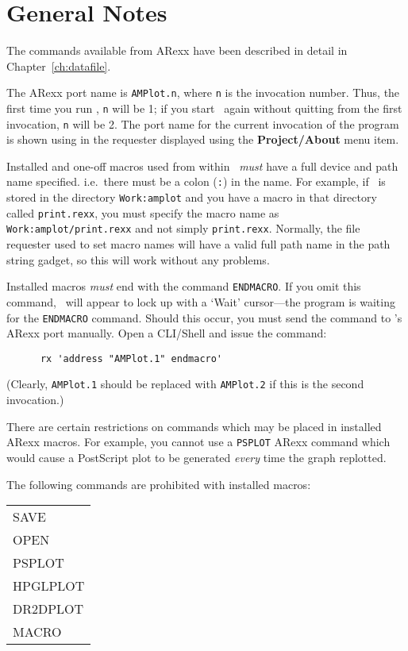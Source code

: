 \section{General Notes}
The commands available from ARexx have been described in detail in 
Chapter~\ref{ch:datafile}.

The ARexx port name is {\tt AMPlot.n}, where {\tt n} is the 
invocation number. 
Thus, the first time you run \amplot, {\tt n} will be 1; if you start \amplot\ 
again without quitting from the first invocation, {\tt n} will be 2. The port 
name for the current invocation of the program is shown using in the requester 
displayed using the {\bf Project/About} menu item.

Installed and one-off macros used from within \amplot\ {\em must\/} have a full device
and path name specified. i.e.\ there must be a colon ({\tt :}) in the name. For 
example, if \amplot\ is stored in the directory {\tt Work:amplot} and you have a 
macro in that directory called {\tt print.rexx}, you must specify the macro name as\\
{\tt Work:amplot/print.rexx} and not simply {\tt print.rexx}. Normally, the file
requester used to set macro names will have a valid full path name in the path string
gadget, so this will work without any problems.

Installed macros {\em must\/} end with the command {\tt ENDMACRO}. If you omit this 
command, \amplot\ will appear to lock up with a `Wait' cursor---the program is 
waiting for the {\tt ENDMACRO} command. Should this occur, you must send the command 
to \amplot's ARexx port manually. Open a CLI/Shell and issue the command:
\begin{verbatim}
      rx 'address "AMPlot.1" endmacro'
\end{verbatim}
(Clearly, {\tt AMPlot.1} should be replaced with {\tt AMPlot.2} if this is the 
second invocation.)

There are certain restrictions on commands which may be placed 
in installed ARexx macros. For example, you cannot use a {\tt PSPLOT} ARexx 
command which would cause a PostScript plot to be generated {\em every\/} 
time the graph replotted.
\newpage

The following commands are prohibited with installed macros:
\begin{center}
\begin{tabular}{l}
SAVE     \\
OPEN     \\
PSPLOT   \\
HPGLPLOT \\
DR2DPLOT \\
MACRO    \\
\end{tabular}
\end{center}

